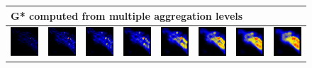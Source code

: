 \documentclass{itatnew}
\begin{document}
\begin{figure}[htp]
  \vspace{1em}
  \begin{tabular}{cccccccc}
    \multicolumn{8}{l}{G* computed from multiple aggregation levels} \\
    \hline
    \includegraphics[width=4.6em]{images/gen-raw-zoom-gstar-1}&
    \includegraphics[width=4.6em]{images/gen-raw-zoom-gstar-2}&
    \includegraphics[width=4.6em]{images/gen-raw-zoom-gstar-3}&
    \includegraphics[width=4.6em]{images/gen-raw-zoom-gstar-4}&
    \includegraphics[width=4.6em]{images/gen-raw-zoom-gstar-5}&
    \includegraphics[width=4.6em]{images/gen-raw-zoom-gstar-6}&
    \includegraphics[width=4.6em]{images/gen-raw-zoom-gstar-7}&
    \includegraphics[width=4.6em]{images/gen-raw-zoom-gstar-8}\\
    

\end{tabular}
\end{figure}
\end{document}
